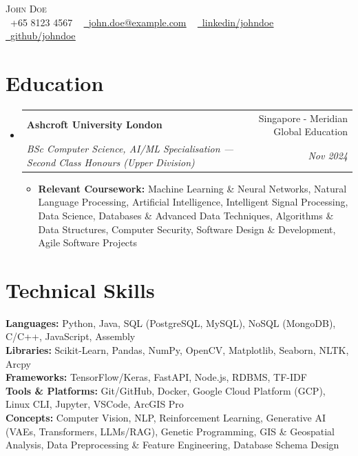 \documentclass[letterpaper,10pt]{article}
\makeatletter
\newcommand{\resumeItem}[1]{\item\small{{#1\vspace{-3pt}}}}
\newcommand{\resumeSubheading}[4]{
  \vspace{-1pt}\item
    \begin{tabular*}{0.98\textwidth}[t]{l@{\extracolsep{\fill}}r}
      \textbf{#1} & #2 \\
      \textit{\small#3} & \textit{\small #4} \\
    \end{tabular*}\vspace{-5pt}
}
\newcommand{\resumeSubHeadingListStart}{\begin{itemize}[leftmargin=0.05in, rightmargin=0in, label={}]}
\newcommand{\resumeSubHeadingListEnd}{\end{itemize}}
\newcommand{\resumeItemListStart}{\begin{itemize}[leftmargin=0.15in, rightmargin=0.05in]\vspace{-2pt}}
\newcommand{\resumeItemListEnd}{\end{itemize}\vspace{-6pt}}
\makeatother
\begin{document}
\begin{center}
    {\huge \scshape John Doe} \\ \vspace{5.0pt}\small 
 \raisebox{-0.1\height} \faPhone\ +65 8123 4567 ~
 \href{mailto:john.doe@example.com}
 {\raisebox{-0.1\height}\faEnvelopeO\  \underline{john.doe@example.com}} ~ 
\href{https://linkedin.com/in/johndoe/}{\raisebox{-0.1\height}\faLinkedinSquare\ \underline{linkedin/johndoe}} ~
\href{https://github.com/johndoe}{\raisebox{-0.1\height}\faGithub\ \underline{github/johndoe}} ~ 
\end{center}
\section{Education}
  \resumeSubHeadingListStart
    \resumeSubheading
      {Ashcroft University London}{Singapore - Meridian Global Education}
      {BSc Computer Science, AI/ML Specialisation \textnormal{---} Second Class Honours (Upper Division)}{Nov 2024}
      \resumeItemListStart
      \vspace{2pt}
        \resumeItem{\textbf{Relevant Coursework:} Machine Learning \& Neural Networks, Natural Language Processing, Artificial Intelligence, Intelligent Signal Processing, Data Science, Databases \& Advanced Data Techniques, Algorithms \& Data Structures, Computer Security, Software Design \& Development, Agile Software Projects}
      \resumeItemListEnd
  \resumeSubHeadingListEnd

\section{Technical Skills}
 \begin{itemize}[leftmargin=0.05in, label={}]
    \small{\item{
     \textbf{Languages:}{ Python, Java, SQL (PostgreSQL, MySQL), NoSQL (MongoDB), C/C++, JavaScript, Assembly} \\
     \textbf{Libraries:}{ Scikit-Learn, Pandas, NumPy, OpenCV, Matplotlib, Seaborn, NLTK, Arcpy} \\
     \textbf{Frameworks:}{ TensorFlow/Keras, FastAPI, Node.js, RDBMS, TF-IDF} \\
     \textbf{Tools \& Platforms:}{ Git/GitHub, Docker, Google Cloud Platform (GCP), Linux CLI, Jupyter, VSCode, ArcGIS Pro} \\
     \textbf{Concepts:}{ Computer Vision, NLP, Reinforcement Learning, Generative AI (VAEs, Transformers, LLMs/RAG), Genetic Programming, GIS \& Geospatial Analysis, Data Preprocessing \& Feature Engineering, Database Schema Design}}}
     \vspace{-4pt}
  \end{itemize}
\end{document}
